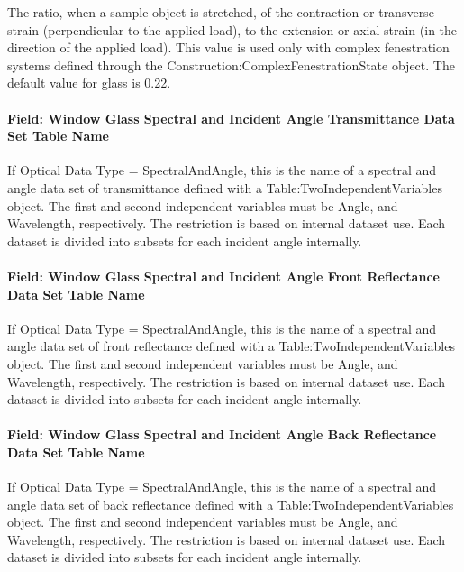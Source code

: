 The ratio, when a sample object is stretched, of the contraction or transverse strain (perpendicular to the applied load), to the extension or axial strain (in the direction of the applied load). This value is used only with complex fenestration systems defined through the Construction:ComplexFenestrationState object. The default value for glass is 0.22.

\paragraph{Field: Window Glass Spectral and Incident Angle Transmittance Data Set Table Name}\label{field-window-glass-spectral-and-incident-angle-transmittance-data}

If Optical Data Type = SpectralAndAngle, this is the name of a spectral and angle data set of transmittance defined with a Table:TwoIndependentVariables object. The first and second independent variables must be Angle, and Wavelength, respectively. The restriction is based on internal dataset use. Each dataset is divided into subsets for each incident angle internally.

\paragraph{Field: Window Glass Spectral and Incident Angle Front Reflectance Data Set Table Name}\label{field-window-glass-spectral-and-incident-angle-front-reflectance-data}

If Optical Data Type = SpectralAndAngle, this is the name of a spectral and angle data set of front reflectance defined with a Table:TwoIndependentVariables object. The first and second independent variables must be Angle, and Wavelength, respectively. The restriction is based on internal dataset use. Each dataset is divided into subsets for each incident angle internally.

\paragraph{Field: Window Glass Spectral and Incident Angle Back Reflectance Data Set Table Name}\label{field-window-glass-spectral-and-incident-angle-back-reflectance-data}

If Optical Data Type = SpectralAndAngle, this is the name of a spectral and angle data set of back reflectance defined with a Table:TwoIndependentVariables object. The first and second independent variables must be Angle, and Wavelength, respectively. The restriction is based on internal dataset use. Each dataset is divided into subsets for each incident angle internally.


